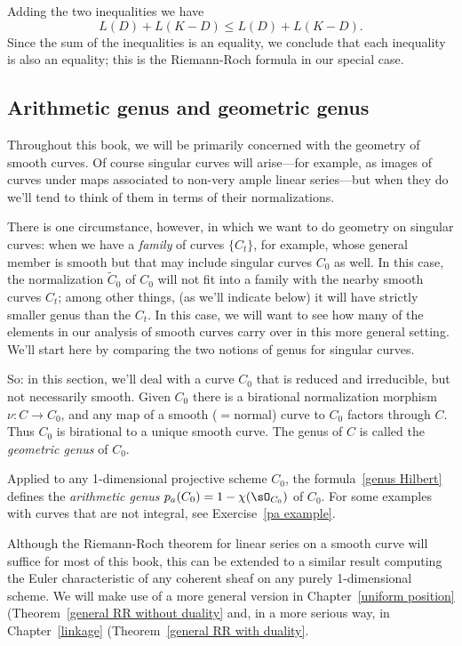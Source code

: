 Adding the two inequalities we have
$$
L(D) + L(K-D) \leq L(D) + L(K-D).
$$
Since the sum of the inequalities is an equality, we conclude that each inequality is also an equality; this is the Riemann-Roch formula
in our special case.

\subsection{Arithmetic genus and geometric genus}

Throughout this book, we will be primarily concerned with the geometry of smooth curves. Of course singular curves will arise---for example, as images of curves under maps associated to non-very ample linear series---but when they do we'll tend to think of them in terms of their normalizations. 

There is one circumstance, however, in which we want to do geometry on singular curves: when we have a \emph{family} of curves $\{C_t\}$, for example, whose general member is smooth but that may include singular curves $C_0$ as well. In this case, the  normalization $\tilde C_0$ of $C_0$ will not fit into a family with the nearby smooth curves $C_t$; among other things, (as we'll indicate below) it will have strictly smaller genus than the $C_t$. In this case, we will want to see how many of the elements in our analysis of smooth curves carry over in this more general setting. We'll start here by comparing the two notions of genus for singular curves.

So: in this section, we'll deal with a  curve $C_0$ that is reduced and irreducible, but not necessarily smooth.
Given $C_0$ there is a birational normalization morphism $\nu: C \to C_0$, and any map of a smooth ($=$normal) curve to $C_0$
factors through $C$. Thus $C_0$ is birational to a unique
smooth curve. The genus of $C$ is called the \emph{geometric genus} of $C_0$.

Applied to any 1-dimensional projective scheme $C_0$, the formula~\ref{genus Hilbert} defines
the \emph{arithmetic genus} $p_a(C_0) = 1-\chi(\sO_{C_0})$ of $C_0$. For some examples with curves that are not
integral, see Exercise~\ref{pa example}.
 
 Although the Riemann-Roch theorem for linear series on a smooth curve will suffice for most of this book, this can
 be extended to a similar result computing the Euler characteristic of any coherent sheaf on any purely 1-dimensional
 scheme. We will make
 use of a more general version in Chapter~\ref{uniform position} (Theorem~\ref{general RR without duality}
  and, in a more serious way, in Chapter~\ref{linkage} (Theorem~\ref{general RR with duality}. 
 

